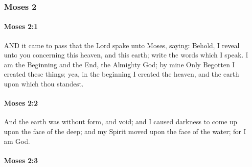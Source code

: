 	\subsubsection{Moses 2} %
		\label{MOSES-2}
		
		\paragraph{Moses 2:1} %
			\label{MOSES-2-1}

			AND it came to pass that the Lord spake unto Moses, saying: Behold, I reveal unto you concerning this heaven, and this earth; write the words which I speak. I am the Beginning and the End, the Almighty God; by mine Only Begotten I created these things; yea, in the beginning I created the heaven, and the earth upon which thou standest.


		\paragraph{Moses 2:2} %
			\label{MOSES-2-2}

			And the earth was without form, and void; and I caused darkness to come up upon the face of the deep; and my Spirit moved upon the face of the water; for I am God.


		\paragraph{Moses 2:3} %
			\label{MOSES-2-3}


